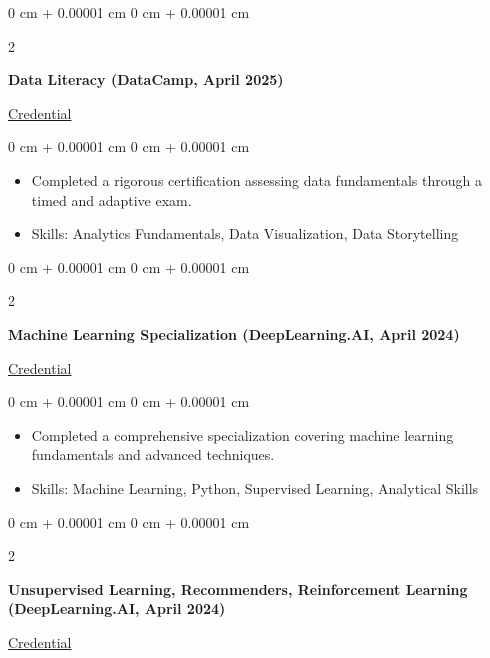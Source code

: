 \documentclass[10pt, letterpaper]{article}
\newenvironment{highlights}{
    \begin{itemize}[
        topsep=0.10 cm,
        parsep=0.10 cm,
        partopsep=0pt,
        itemsep=0pt,
        leftmargin=0 cm + 10pt
    ]
}{
    \end{itemize}
} %
\newenvironment{onecolentry}{
    \begin{adjustwidth}{
        0 cm + 0.00001 cm
    }{
        0 cm + 0.00001 cm
    }
}{
    \end{adjustwidth}
} %
\newenvironment{twocolentry}[2][]{
    \onecolentry
    \def\secondColumn{#2}
    \setcolumnwidth{\fill, 4.5 cm}
    \begin{paracol}{2}
}{
    \switchcolumn \raggedleft \secondColumn
    \end{paracol}
    \endonecolentry
} %
\begin{document}
\begin{twocolentry}
    {\href{https://www.datacamp.com/skill-verification/DL0033352802672}{Credential}}
    \textbf{Data Literacy (DataCamp, April 2025)}
\end{twocolentry}
\vspace{0.10 cm}


\begin{onecolentry}
    \begin{highlights}
        \item Completed a rigorous certification assessing data fundamentals through a timed and adaptive exam.
        \item Skills: Analytics Fundamentals, Data Visualization, Data Storytelling
    \end{highlights}
\end{onecolentry}
\vspace{0.2 cm}

        \vspace{0.2 cm}
 
        \begin{twocolentry}
            {\href{https://www.coursera.org/account/accomplishments/specialization/BA8N9Y8JDSSN}{Credential}}
            \textbf{Machine Learning Specialization (DeepLearning.AI, April 2024)}
        \end{twocolentry}
        \vspace{0.10 cm}
        
        \begin{onecolentry}
            \begin{highlights}
                \item Completed a comprehensive specialization covering machine learning fundamentals and advanced techniques.
                \item Skills: Machine Learning, Python, Supervised Learning, Analytical Skills
            \end{highlights}
        \end{onecolentry}
        \vspace{0.2 cm}

        \begin{twocolentry}
            {\href{https://www.coursera.org/account/accomplishments/verify/FSHG9XHXRZ35}{Credential}}
            \textbf{Unsupervised Learning, Recommenders, Reinforcement Learning (DeepLearning.AI, April 2024)}
        \end{twocolentry}
        \vspace{0.10 cm}
        
\end{document}
